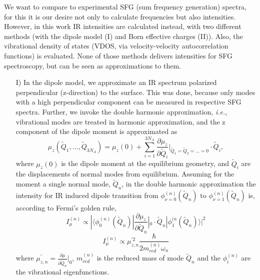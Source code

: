 \documentclass[11pt,DIV=13,BCOR=5mm,a4paper,headinclude]{scrbook}
\begin{document}
We want to compare to experimental SFG (sum frequency generation) spectra, for this it is our desire not only to calculate frequencies but also intensities.
However, in this work IR intensities are calculated instead, with two different methods (with the dipole model (I) and Born effective charges (II)).
Also, the vibrational density of states (VDOS, via velocity-velocity autocorrelation functions) is evaluated.
None of those methods delivers intensities for SFG spectroscopy, but can be seen as approximations to them\cite{Melani2018}.


\begin{itemize}
 \item[I)]
 In the dipole model, we approximate an IR spectrum polarized perpendicular (z-direction) to the surface.
This was done, because only modes with a high perpendicular component can be measured in respective SFG spectra.
 Further, we invoke the double harmonic approximation, \textit{i.e.}, vibrational modes are treated in harmonic approximation, and the z component of the dipole moment is approximated as
 \begin{equation}
  \mu_z(\tilde{Q}_1,...,\tilde{Q}_{3N_A})=\mu_z(0) + \sum_{i=1}^{3N_A}\frac{\partial \mu_z}{\partial \tilde{Q}_i}|_{\tilde{Q}_1=\tilde{Q}_2=...=0}\cdot \tilde{Q}_i ,
 \end{equation}
 where $\mu_z(0)$ is the dipole moment at the equilibrium geometry, and $\tilde{Q}_i$ are the displacements of normal modes from equilibrium.
Assuming for the moment a single normal mode, $\tilde{Q}_n$, in the double harmonic approximation the intensity for IR induced dipole transition from $\phi_{\nu=0}^{(n)}(\tilde{Q}_n)$ to $\phi_{\nu=1}^{(n)}(\tilde{Q}_n)$ is, according to Fermi's golden rule,
\begin{equation}
I_\mu^{(n)}\propto |\langle \phi_0^{(n)}(\tilde{Q}_n)|\frac{\partial \mu_z}{\partial \tilde{Q}_n}|_0\cdot \tilde{Q}_n|\phi_1^{(n}(\tilde{Q}_n) \rangle|^2
\end{equation}
\begin{equation}\label{eq:mu-int}
I_\mu^{(n)}\propto \mu_{z,n}^{\prime 2} \frac{\hbar}{2m_{red}^{(n)}\omega_n}
\end{equation}
where $\mu_{z,n}^{\prime}=\frac{\partial \mu}{\partial \tilde{Q}_n}|_0$, $m_{red}^{(n)}$ is the reduced mass of mode $\tilde{Q}_n$ and the $\phi_i^{(n)}$ are the vibrational eigenfunctions.


\end{itemize}
\end{document}
